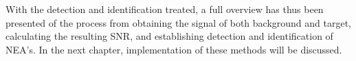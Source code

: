 With the detection and identification treated, a full overview has thus been presented of the process from obtaining the signal of both background and target, calculating the resulting SNR, and establishing detection and identification of NEA's. In the next chapter, implementation of these methods will be discussed.

